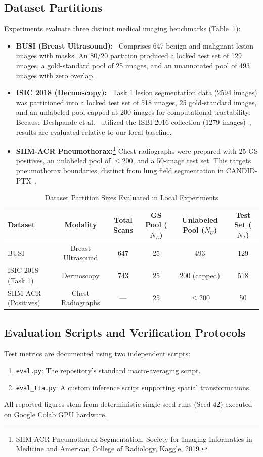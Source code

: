 \documentclass[journal,11pt,onecolumn,draftclsnofoot]{IEEEtran}
\begin{document}
\subsection{Dataset Partitions}
Experiments evaluate three distinct medical imaging benchmarks (Table~\ref{tab:splits}):
\begin{itemize}
    \item \textbf{BUSI (Breast Ultrasound):}~\cite{aldhabyani2020} Comprises 647 benign and malignant lesion images with masks. An 80/20 partition produced a locked test set of 129 images, a gold-standard pool of 25 images, and an unannotated pool of 493 images with zero overlap.
    \item \textbf{ISIC 2018 (Dermoscopy):}~\cite{codella2019} Task 1 lesion segmentation data (2594 images) was partitioned into a locked test set of 518 images, 25 gold-standard images, and an unlabeled pool capped at 200 images for computational tractability. Because Deshpande et al.~\cite{deshpande2024} utilized the ISBI 2016 collection (1279 images)~\cite{gutman2016}, results are evaluated relative to our local baseline.
    \item \textbf{SIIM-ACR Pneumothorax:}\footnote{SIIM-ACR Pneumothorax Segmentation, Society for Imaging Informatics in Medicine and American College of Radiology, Kaggle, 2019.} Chest radiographs were prepared with 25 GS positives, an unlabeled pool of $\le 200$, and a 50-image test set. This targets pneumothorax boundaries, distinct from lung field segmentation in CANDID-PTX~\cite{feng2021}.
\end{itemize}

\begin{table}[t]
\renewcommand{\arraystretch}{1.15}
\caption{Dataset Partition Sizes Evaluated in Local Experiments}
\label{tab:splits}
\centering\footnotesize
\begin{tabular}{@{}lccccc@{}}
\toprule
Dataset & Modality & Total Scans & GS Pool ($N_L$) & Unlabeled Pool ($N_U$) & Test Set ($N_T$) \\
\midrule
BUSI & Breast Ultrasound & 647 & 25 & 493 & 129 \\
ISIC 2018 (Task 1) & Dermoscopy & 743 & 25 & 200 (capped) & 518 \\
SIIM-ACR (Positives) & Chest Radiographs & --- & 25 & $\le$200 & 50 \\
\bottomrule
\end{tabular}
\end{table}

\subsection{Evaluation Scripts and Verification Protocols}
Test metrics are documented using two independent scripts:
\begin{enumerate}
    \item \texttt{eval.py}: The repository's standard macro-averaging script.
    \item \texttt{eval\_tta.py}: A custom inference script supporting spatial transformations.
\end{enumerate}
All reported figures stem from deterministic single-seed runs (Seed 42) executed on Google Colab GPU hardware.
\end{document}
